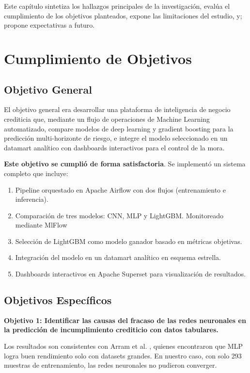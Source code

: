 Este capítulo sintetiza los hallazgos principales de la investigación, evalúa el cumplimiento de los objetivos planteados, expone las limitaciones del estudio, y; propone expectativas a futuro.

\section{Cumplimiento de Objetivos}

\subsection{Objetivo General}

El objetivo general era desarrollar una plataforma de inteligencia de negocio crediticia que, mediante un flujo de operaciones de Machine Learning automatizado, compare modelos de deep learning y gradient boosting para la predicción multi-horizonte de riesgo, e integre el modelo seleccionado en un datamart analítico con dashboards interactivos para el control de la mora.

\textbf{Este objetivo se cumplió de forma  satisfactoria}. Se implementó un sistema completo que incluye:

\begin{enumerate}
    \item Pipeline orquestado en Apache Airflow con dos flujos (entrenamiento e inferencia).
    \item Comparación de tres modelos: CNN, MLP y LightGBM. Monitoreado mediante MlFlow
    \item Selección de LightGBM como modelo ganador basado en métricas objetivas.
    \item Integración del modelo en un datamart analítico en esquema estrella.
    \item Dashboards interactivos en Apache Superset para visualización de resultados.
\end{enumerate}

\subsection{Objetivos Específicos}

\textbf{Objetivo 1: Identificar las causas del fracaso de las redes neuronales en la predicción de incumplimiento crediticio con datos tabulares.}

Los resultados son consistentes con Arram et al. \cite{arram2023credit}, quienes encontraron que MLP logra buen rendimiento solo con datasets grandes. En nuestro caso, con solo 293 muestras de entrenamiento, las redes neuronales no pudieron converger.

